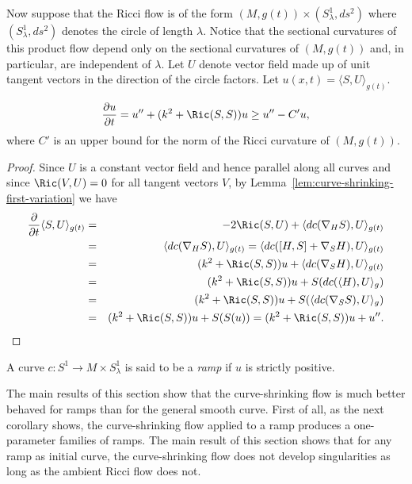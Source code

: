 Now suppose that the Ricci flow is of the form $(M, g(t))\times
(S^1_\lambda,ds^2)$ where $(S^1_\lambda,ds^2)$ denotes the  circle
of length $\lambda$. Notice that the sectional curvatures of this
product flow depend only on the sectional curvatures of $(M, g(t))$
and, in particular, are independent of $\lambda$. Let $U$ denote
vector field made up of unit tangent vectors in the direction of the
circle factors. Let $u(x,t)=\langle S,U\rangle_{g(t)}$.

\begin{claim}
\label{claim:ramp-function-evolution}
\label{rampcomp}
$$\frac{\partial u}{\partial t}=u''+(k^2+\Ric(S,S))u\ge u''-C'u,$$
where $C'$ is an upper bound for the norm of the Ricci curvature of
$(M,g(t))$.
\end{claim}


\begin{proof}
Since $U$ is a constant vector field and hence parallel along all curves and
since $\Ric(V,U)=0$ for all tangent vectors $V$, by Lemma~\ref{lem:curve-shrinking-first-variation}
we have
\begin{eqnarray*}
\frac{\partial}{\partial t}\langle S,U\rangle_{g(t)} & = & -2\Ric(S,U)
+\langle dc(\nabla_HS),U\rangle_{g(t)} \\
& = & \langle dc(\nabla_HS),U\rangle_{g(t)}
=  \langle dc([H,S]+\nabla_SH),U\rangle_{g(t)} \\
& = & (k^2+\Ric(S,S))u+\langle dc(\nabla_SH),U\rangle_{g(t)} \\
& = & (k^2+\Ric(S,S))u+S(dc(\langle H),U\rangle_{g}) \\
 & = & (k^2+\Ric(S,S))u+S(\langle dc(\nabla_SS),U\rangle_g) \\
&  = & (k^2+\Ric(S,S))u+S(S(u))  =  (k^2+\Ric(S,S))u+u''.
 \end{eqnarray*}
\end{proof}

\begin{definition}[Ramp]
\label{def:ramp-curve}
A curve $c\colon S^1\to  M\times S^1_\lambda$ is said to be a {\em
ramp} if $u$ is strictly positive.
\end{definition}

The main results of this section show that the curve-shrinking flow
is much better behaved for ramps  than for the general smooth curve.
First of all, as the next corollary shows, the curve-shrinking flow
applied to a ramp produces a one-parameter families of ramps. The
main result of this section shows that for any ramp as initial
curve, the curve-shrinking flow does not develop singularities as
long as the ambient Ricci flow does not.


